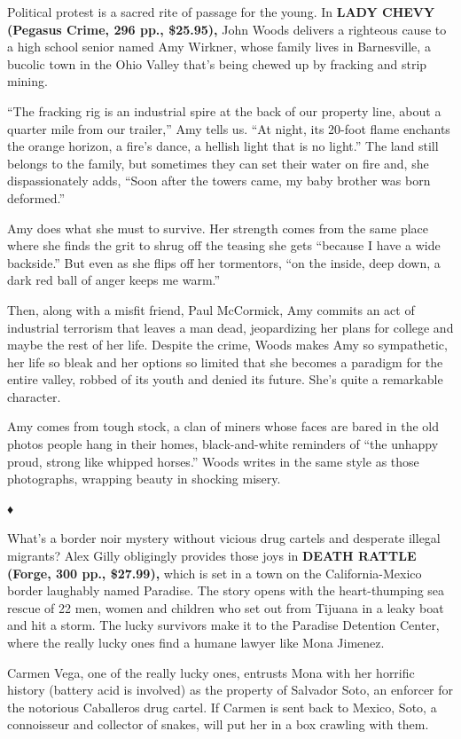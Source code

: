 Political protest is a sacred rite of passage for the young. In
\textbf{LADY CHEVY (Pegasus Crime, 296 pp., \$25.95),} John Woods
delivers a righteous cause to a high school senior named Amy Wirkner,
whose family lives in Barnesville, a bucolic town in the Ohio Valley
that's being chewed up by fracking and strip mining.

``The fracking rig is an industrial spire at the back of our property
line, about a quarter mile from our trailer,'' Amy tells us. ``At night,
its 20-foot flame enchants the orange horizon, a fire's dance, a hellish
light that is no light.'' The land still belongs to the family, but
sometimes they can set their water on fire and, she dispassionately
adds, ``Soon after the towers came, my baby brother was born deformed.''

Amy does what she must to survive. Her strength comes from the same
place where she finds the grit to shrug off the teasing she gets
``because I have a wide backside.'' But even as she flips off her
tormentors, ``on the inside, deep down, a dark red ball of anger keeps
me warm.''

Then, along with a misfit friend, Paul McCormick, Amy commits an act of
industrial terrorism that leaves a man dead, jeopardizing her plans for
college and maybe the rest of her life. Despite the crime, Woods makes
Amy so sympathetic, her life so bleak and her options so limited that
she becomes a paradigm for the entire valley, robbed of its youth and
denied its future. She's quite a remarkable character.

Amy comes from tough stock, a clan of miners whose faces are bared in
the old photos people hang in their homes, black-and-white reminders of
``the unhappy proud, strong like whipped horses.'' Woods writes in the
same style as those photographs, wrapping beauty in shocking misery.

♦

What's a border noir mystery without vicious drug cartels and desperate
illegal migrants? Alex Gilly obligingly provides those joys in
\textbf{DEATH RATTLE (Forge, 300 pp., \$27.99),} which is set in a town
on the California-Mexico border laughably named Paradise. The story
opens with the heart-thumping sea rescue of 22 men, women and children
who set out from Tijuana in a leaky boat and hit a storm. The lucky
survivors make it to the Paradise Detention Center, where the really
lucky ones find a humane lawyer like Mona Jimenez.

Carmen Vega, one of the really lucky ones, entrusts Mona with her
horrific history (battery acid is involved) as the property of Salvador
Soto, an enforcer for the notorious Caballeros drug cartel. If Carmen is
sent back to Mexico, Soto, a connoisseur and collector of snakes, will
put her in a box crawling with them.

